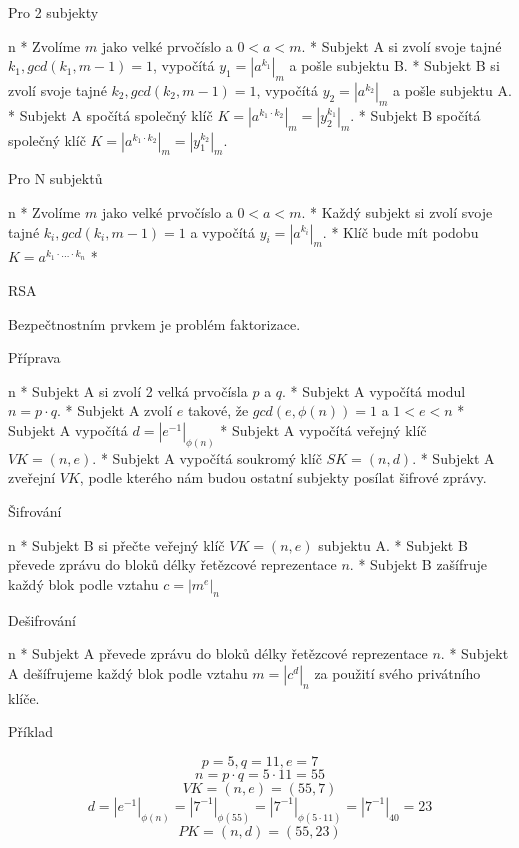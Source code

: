 \secc Pro 2 subjekty

\begitems \style n
* Zvolíme $m$ jako velké prvočíslo a $0 < a < m$.
* Subjekt A si zvolí svoje tajné $k_1, gcd(k_1, m - 1) = 1$, vypočítá $y_1 = \left| a^{k_1} \right|_m$ a pošle subjektu B.
* Subjekt B si zvolí svoje tajné $k_2, gcd(k_2, m - 1) = 1$, vypočítá $y_2 = \left| a^{k_2} \right|_m$ a pošle subjektu A.
* Subjekt A spočítá společný klíč $K = \left|a^{k_1 \cdot k_2}\right|_m = \left|y_{2}^{k_1}\right|_m$.
* Subjekt B spočítá společný klíč $K = \left|a^{k_1 \cdot k_2}\right|_m = \left|y_{1}^{k_2}\right|_m$.
\enditems

\secc Pro N subjektů

\begitems \style n
* Zvolíme $m$ jako velké prvočíslo a $0 < a < m$.
* Každý subjekt si zvolí svoje tajné $k_i, gcd(k_i, m - 1) = 1$ a vypočítá $y_i = \left| a^{k_i} \right|_m$.
* Klíč bude mít podobu $K = a^{k_1 \cdot \ldots \cdot k_n}$
* 
\enditems

\sec RSA

Bezpečtnostním prvkem je problém faktorizace.

\secc Příprava

\begitems \style n
* Subjekt A si zvolí 2 velká prvočísla $p$ a $q$.
* Subjekt A vypočítá modul $n = p \cdot q$.
* Subjekt A zvolí $e$ takové, že $gcd\left(e, \phi\left(n\right)\right) = 1$ a $1 < e < n$
* Subjekt A vypočítá $d = \left|e^{-1}\right|_{\phi\left(n\right)}$
* Subjekt A vypočítá veřejný klíč $VK = \left(n, e\right)$.
* Subjekt A vypočítá soukromý klíč $SK = \left(n, d\right)$.
* Subjekt A zveřejní $VK$, podle kterého nám budou ostatní subjekty posílat šifrové zprávy.
\enditems

\secc Šifrování

\begitems \style n
* Subjekt B si přečte veřejný klíč $VK = \left(n, e\right)$ subjektu A.
* Subjekt B převede zprávu do bloků délky řetězcové reprezentace $n$.
* Subjekt B zašífruje každý blok podle vztahu $c = \left|m^e\right|_n$
\enditems

\secc Dešifrování

\begitems \style n
* Subjekt A převede zprávu do bloků délky řetězcové reprezentace $n$.
* Subjekt A dešífrujeme každý blok podle vztahu $m = \left|c^d\right|_n$ za použití svého privátního klíče.
\enditems

\secc Příklad

$$p = 5, q = 11, e = 7$$
$$n = p \cdot q = 5 \cdot 11 = 55$$
$$VK = (n, e) = (55, 7)$$
$$d = \left|e^{-1}\right|_{\phi(n)} = \left|7^{-1}\right|_{\phi(55)} = \left|7^{-1}\right|_{\phi(5 \cdot 11)} = \left|7^{-1}\right|_{40} = 23$$
$$PK = (n, d) = (55, 23)$$

